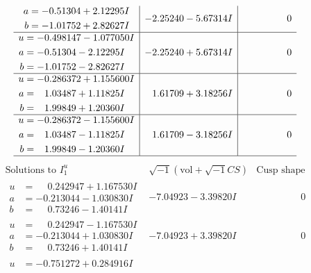 \documentclass[1p]{elsarticle_modified}
\theoremstyle{definition}
\newcommand{\I}{\sqrt{-1}}
\begin{document}
$$\begin{array}{c|c|c}
\begin{aligned}
a &= -0.51304 + 2.12295 I \\
b &= -1.01752 + 2.82627 I\end{aligned}
 & -2.25240 - 5.67314 I & \phantom{-0.000000 } 0 \\ \hline\begin{aligned}
u &= -0.498147 - 1.077050 I \\
a &= -0.51304 - 2.12295 I \\
b &= -1.01752 - 2.82627 I\end{aligned}
 & -2.25240 + 5.67314 I & \phantom{-0.000000 } 0 \\ \hline\begin{aligned}
u &= -0.286372 + 1.155600 I \\
a &= \phantom{-}1.03487 + 1.11825 I \\
b &= \phantom{-}1.99849 + 1.20360 I\end{aligned}
 & \phantom{-}1.61709 + 3.18256 I & \phantom{-0.000000 } 0 \\ \hline\begin{aligned}
u &= -0.286372 - 1.155600 I \\
a &= \phantom{-}1.03487 - 1.11825 I \\
b &= \phantom{-}1.99849 - 1.20360 I\end{aligned}
 & \phantom{-}1.61709 - 3.18256 I & \phantom{-0.000000 } 0\\
 \hline 
 \end{array}$$\newpage$$\begin{array}{c|c|c}  
\text{Solutions to }I^u_{1}& \I (\text{vol} + \sqrt{-1}CS) & \text{Cusp shape}\\
 \hline 
\begin{aligned}
u &= \phantom{-}0.242947 + 1.167530 I \\
a &= -0.213044 - 1.030830 I \\
b &= \phantom{-}0.73246 - 1.40141 I\end{aligned}
 & -7.04923 - 3.39820 I & \phantom{-0.000000 } 0 \\ \hline\begin{aligned}
u &= \phantom{-}0.242947 - 1.167530 I \\
a &= -0.213044 + 1.030830 I \\
b &= \phantom{-}0.73246 + 1.40141 I\end{aligned}
 & -7.04923 + 3.39820 I & \phantom{-0.000000 } 0 \\ \hline\begin{aligned}
u &= -0.751272 + 0.284916 I \\

\end{aligned}
\end{array}$$
\end{document}
